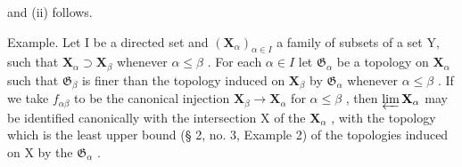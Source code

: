 and (ii) follows.

Example. Let I be a directed set and \((\mathbf{X}_{\alpha})_{\alpha \in I}\) a family of subsets of a set Y, such that \(\mathbf{X}_{\alpha} \supset \mathbf{X}_{\beta}\) whenever \(\alpha \leqslant \beta\) . For each \(\alpha \in I\) let \(\mathfrak{G}_{\alpha}\) be a topology on \(\mathbf{X}_{\alpha}\) such that \(\mathfrak{G}_{\beta}\) is finer than the topology induced on \(\mathbf{X}_{\beta}\) by \(\mathfrak{G}_{\alpha}\) whenever \(\alpha \leqslant \beta\) . If we take \(f_{\alpha \beta}\) to be the canonical injection \(\mathbf{X}_{\beta} \to \mathbf{X}_{\alpha}\) for \(\alpha \leqslant \beta\) , then \(\varprojlim \mathbf{X}_{\alpha}\) may be identified canonically with the intersection X of the \(\mathbf{X}_{\alpha}\) , with the topology which is the least upper bound (§ 2, no. 3, Example 2) of the topologies induced on X by the \(\mathfrak{G}_{\alpha}\) .


